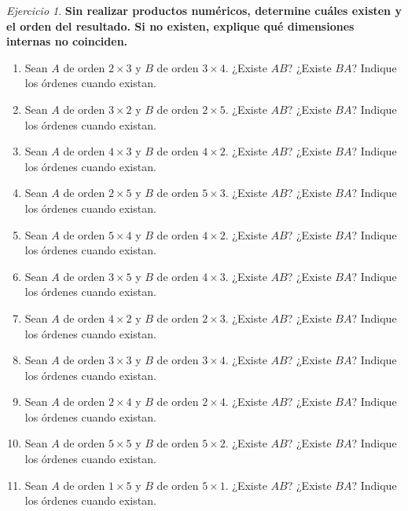 \documentclass[12pt]{article}
\theoremstyle{remark}
\newtheorem{Ejer}[definicion]{Ejercicio}
\begin{document}
\begin{Ejer}

\textbf{Sin realizar productos numéricos, determine cuáles existen y el orden del resultado. Si no existen, explique qué dimensiones internas no coinciden.}
\begin{enumerate}[start=97]

\item Sean $A$ de orden $2\times3$ y $B$ de orden $3\times4$. ¿Existe $AB$? ¿Existe $BA$? Indique los órdenes cuando existan.

\item Sean $A$ de orden $3\times2$ y $B$ de orden $2\times5$. ¿Existe $AB$? ¿Existe $BA$? Indique los órdenes cuando existan.

\item Sean $A$ de orden $4\times3$ y $B$ de orden $4\times2$. ¿Existe $AB$? ¿Existe $BA$? Indique los órdenes cuando existan.

\item Sean $A$ de orden $2\times5$ y $B$ de orden $5\times3$. ¿Existe $AB$? ¿Existe $BA$? Indique los órdenes cuando existan.

\item Sean $A$ de orden $5\times4$ y $B$ de orden $4\times2$. ¿Existe $AB$? ¿Existe $BA$? Indique los órdenes cuando existan.

\item Sean $A$ de orden $3\times5$ y $B$ de orden $4\times3$. ¿Existe $AB$? ¿Existe $BA$? Indique los órdenes cuando existan.

\item Sean $A$ de orden $4\times2$ y $B$ de orden $2\times3$. ¿Existe $AB$? ¿Existe $BA$? Indique los órdenes cuando existan.

\item Sean $A$ de orden $3\times3$ y $B$ de orden $3\times4$. ¿Existe $AB$? ¿Existe $BA$? Indique los órdenes cuando existan.

\item Sean $A$ de orden $2\times4$ y $B$ de orden $2\times4$. ¿Existe $AB$? ¿Existe $BA$? Indique los órdenes cuando existan.

\item Sean $A$ de orden $5\times5$ y $B$ de orden $5\times2$. ¿Existe $AB$? ¿Existe $BA$? Indique los órdenes cuando existan.

\item Sean $A$ de orden $1\times5$ y $B$ de orden $5\times1$. ¿Existe $AB$? ¿Existe $BA$? Indique los órdenes cuando existan.


\end{enumerate}
\end{Ejer}
\end{document}
